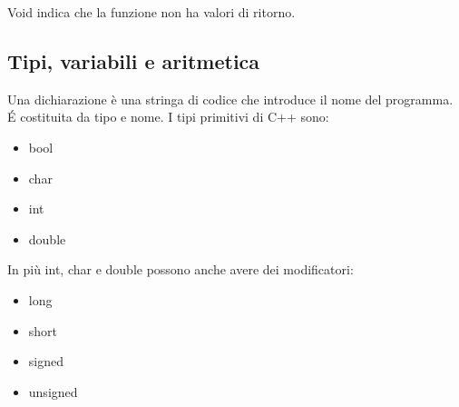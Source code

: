 \documentclass[11pt,a4paper]{book}
\begin{document}
\label{code: 002}
Void indica che la funzione non ha valori di ritorno.

\subsection{Tipi, variabili e aritmetica}
Una dichiarazione è una stringa di codice che introduce il nome del programma. É costituita da tipo e nome. I tipi primitivi di C++ sono:
\begin{itemize}
	\item bool
	\item char
	\item int
	\item double
\end{itemize}
In più int, char e double possono anche avere dei modificatori:
\begin{itemize}
	\item long
	\item short
	\item signed
	\item unsigned
\end{itemize}
\end{document}
